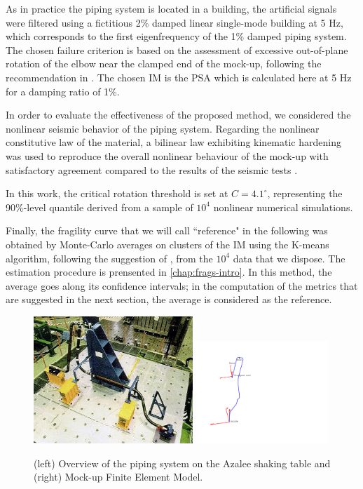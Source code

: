 As in practice the piping system is located in a building, the artificial signals were filtered using a fictitious 2\% damped linear single-mode building at 5 Hz, which corresponds to the first eigenfrequency of the 1\% damped piping system. The chosen failure criterion is based on the assessment of excessive out-of-plane rotation of the elbow near the clamped end of the mock-up, following the recommendation in \cite{touboul_enhanced_2006}. {The chosen IM is the PSA which is calculated here at 5 Hz for a damping ratio of 1\%.}

In order to evaluate the effectiveness of the proposed method, we considered the nonlinear seismic behavior of the piping system. Regarding the nonlinear constitutive law of the material, a bilinear law exhibiting kinematic hardening was used to reproduce the overall nonlinear behaviour of the mock-up with satisfactory agreement compared to the results of the seismic tests \citep{touboul_seismic_1999}. 

In this work, the critical rotation threshold is set at $C = 4.1^{\circ}$, representing the 90\%-level quantile derived from a sample of $10^4$ nonlinear numerical simulations.

Finally, the fragility curve that we will call ``reference" in the following was obtained by Monte-Carlo averages on clusters of the IM using the K-means algorithm, following the suggestion of \citet{trevlopoulos_parametric_2019}, from the $10^4$ data that we dispose. 
The estimation procedure is prensented in \cref{chap:frags-intro}. In this method, the average goes along its confidence intervals; in the computation of the metrics that are suggested in the next section, the average is considered as the reference. %

\begin{figure} %
		\centering		
		\includegraphics[width=6cm]{figures/low-doe/ASG.jpg}
		\hspace{0.5cm}
		\includegraphics[trim= 1cm  3.8cm 12cm 1.5cm, clip,width=5cm]{figures/low-doe/ASG_FEM.pdf}
		\caption{(left) Overview of the piping system on the Azalee shaking table and (right) Mock-up Finite Element Model.}
		\label{lowdoe:fig:ASG}
	\end{figure}


